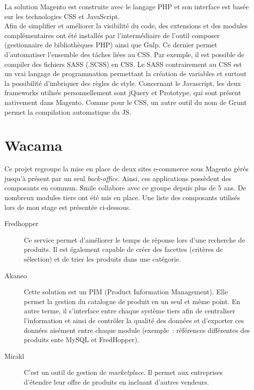 \documentclass[12pt, a4paper, twoside]{report}
\begin{document}
La solution Magento est construite avec le langage PHP et son interface est basée sur les technologies CSS et JavaScript. \\

Afin de simplifier et améliorer la visibilité du code, des extensions et des modules complémentaires ont été installés par l'intermédiaire de l'outil composer (gestionnaire de bibliothèques PHP) ainsi que Gulp. Ce dernier permet d'automatiser l'ensemble des tâches liées au CSS. Par exemple, il est possible de compiler des fichiers SASS (.SCSS) en CSS. Le SASS contrairement au CSS est un vrai langage de programmation permettant la création de variables et surtout la possibilité d’imbriquer des règles de style. Concernant le Javascript, les deux frameworks utilisés personnellement sont jQuery et Prototype, qui sont présent nativement dans Magento. Comme pour le CSS, un autre outil du nom de Grunt permet la compilation automatique du JS.


\section{Wacama}

Ce projet regroupe la mise en place de deux sites e-commerce sous Magento gérés jusqu'à présent par un seul \textit{back-office}. Ainsi, ces applications possèdent des composants en commun. Smile collabore avec ce groupe depuis plus de 5 ans. De nombreux modules tiers ont été mis en place. Une liste des composants utilisés lors de mon stage est présentée ci-dessous. \\

\begin{description}
	\item[Fredhopper] Ce service permet d'améliorer le temps de réponse lors d'une recherche de produits. Il est également capable de créer des facettes (critères de sélection) et de trier les produits dans une catégorie. \\
	
	\item[Akaneo] Cette solution est un PIM (Product Information Management). Elle permet la gestion du catalogue de produit en un seul et même point. En autre terme, il s'interface entre chaque système tiers afin de centraliser l'information et ainsi de contrôler la qualité des données et d'exporter ces données aisément entre chaque module (exemple : références différentes des produits ente MySQL et FredHopper). \\
	
	\item[Mirakl] C'est un outil de gestion de \textit{marketplace}. Il permet aux entreprises d'étendre leur offre de produits en incluant d'autres vendeurs. \\
\end{description}
\end{document}
